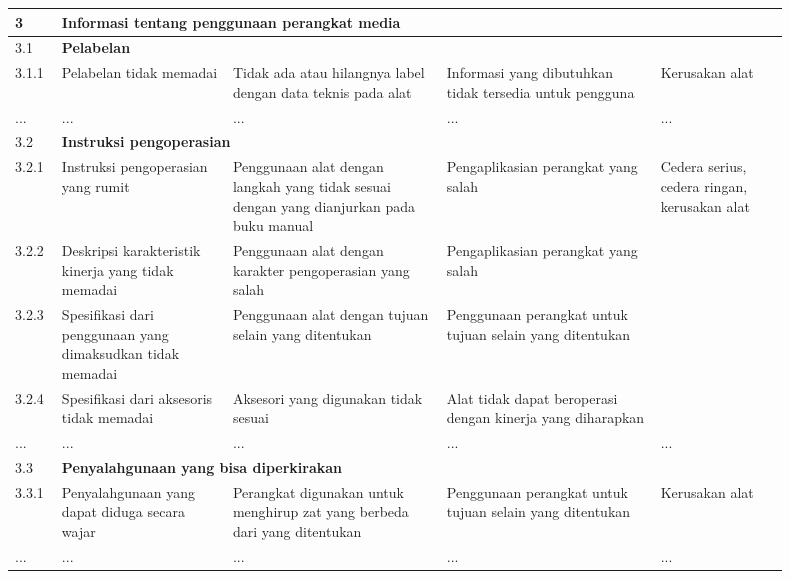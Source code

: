 \documentclass[11pt,a4paper,twoside,onecolumn]{book}
\begin{document}
\begin{longtable}{p{0.05\linewidth} p{0.20\linewidth} p{0.25\linewidth} p{0.25\linewidth} p{0.15\linewidth}}
				
				\hline
				\hline
				\cellcolor{cyan} 3 & \multicolumn{4}{l}{\textbf{Informasi tentang penggunaan perangkat media} \cellcolor{cyan}} \\
				\hline
				3.1 & \multicolumn{4}{l}{\textbf{Pelabelan}} \\
				\hline
				3.1.1 & Pelabelan tidak memadai  & Tidak ada atau hilangnya label dengan data teknis pada alat  & Informasi yang dibutuhkan tidak tersedia untuk pengguna  & Kerusakan alat \\
				\hline
				... & ... & ... & ... & ... \\
				\hline
				3.2 & \multicolumn{4}{l}{\textbf{Instruksi pengoperasian}} \\
				\hline
				3.2.1 & Instruksi pengoperasian yang rumit & Penggunaan alat dengan langkah yang tidak sesuai dengan yang dianjurkan pada buku manual  & Pengaplikasian perangkat yang salah  & \multirow{4}{\linewidth}{Cedera serius, cedera ringan, kerusakan alat} \\ \cline{1-4}
				3.2.2 & Deskripsi karakteristik kinerja yang tidak memadai  & Penggunaan alat dengan karakter pengoperasian yang salah  & Pengaplikasian perangkat yang salah  &  \\ \cline{1-4}
				3.2.3 & Spesifikasi dari 
				penggunaan 	yang dimaksudkan tidak memadai  & Penggunaan alat dengan tujuan selain yang ditentukan  & Penggunaan perangkat untuk tujuan selain yang ditentukan &  \\ \cline{1-4}
				3.2.4 & Spesifikasi dari 
				aksesoris 	tidak memadai  & Aksesori yang digunakan tidak sesuai  & Alat tidak dapat beroperasi dengan kinerja yang diharapkan  &  \\ \cline{1-4}
				\hline
				... & ... & ... & ... & ... \\
				\hline		
				
				3.3 & \multicolumn{4}{l}{\textbf{Penyalahgunaan yang bisa diperkirakan}} \\
				\hline
				3.3.1 & Penyalahgunaan yang dapat diduga secara wajar  & Perangkat digunakan untuk menghirup zat yang berbeda dari yang ditentukan  & Penggunaan perangkat untuk tujuan selain yang ditentukan  & Kerusakan alat \\
				\hline
				... & ... & ... & ... & ... \\
				\hline
				

\end{longtable}
\end{document}
